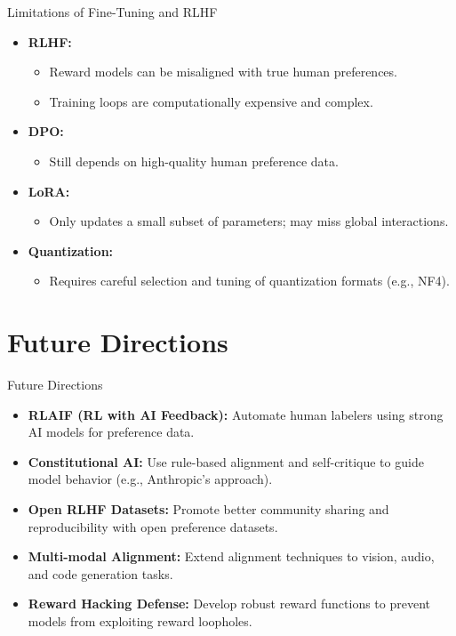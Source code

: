 \begin{frame}{Limitations of Fine-Tuning and RLHF}
    \begin{itemize}
        \item \textbf{RLHF:}
        \begin{itemize}
            \item Reward models can be misaligned with true human preferences.
            \item Training loops are computationally expensive and complex.
        \end{itemize}
        \item \textbf{DPO:}
        \begin{itemize}
            \item Still depends on high-quality human preference data.
        \end{itemize}
        \item \textbf{LoRA:}
        \begin{itemize}
            \item Only updates a small subset of parameters; may miss global interactions.
        \end{itemize}
        \item \textbf{Quantization:}
        \begin{itemize}
            \item Requires careful selection and tuning of quantization formats (e.g., NF4).
        \end{itemize}
    \end{itemize}
\end{frame}


\section{Future Directions}
\begin{frame}{Future Directions}
    \begin{itemize}
        \item \textbf{RLAIF (RL with AI Feedback):} Automate human labelers using strong AI models for preference data.
        \item \textbf{Constitutional AI:} Use rule-based alignment and self-critique to guide model behavior (e.g., Anthropic's approach).
        \item \textbf{Open RLHF Datasets:} Promote better community sharing and reproducibility with open preference datasets.
        \item \textbf{Multi-modal Alignment:} Extend alignment techniques to vision, audio, and code generation tasks.
        \item \textbf{Reward Hacking Defense:} Develop robust reward functions to prevent models from exploiting reward loopholes.
    \end{itemize}
\end{frame}


